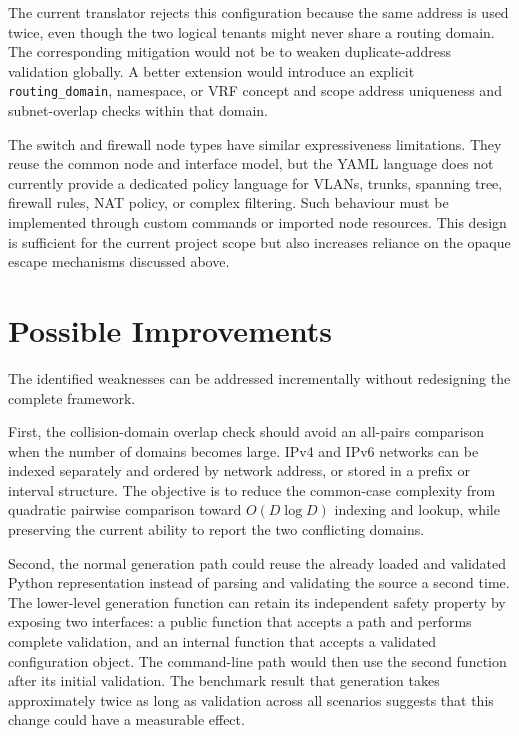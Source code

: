 The current translator rejects this configuration because the same address is
used twice, even though the two logical tenants might never share a routing
domain. The corresponding mitigation would not be to weaken duplicate-address
validation globally. A better extension would introduce an explicit
\texttt{routing\_domain}, namespace, or VRF concept and scope address
uniqueness and subnet-overlap checks within that domain.

The switch and firewall node types have similar expressiveness limitations.
They reuse the common node and interface model, but the YAML language does not
currently provide a dedicated policy language for VLANs, trunks, spanning
tree, firewall rules, NAT policy, or complex filtering. Such behaviour must be
implemented through custom commands or imported node resources. This design is
sufficient for the current project scope but also increases reliance on the
opaque escape mechanisms discussed above.

\section{Possible Improvements}
\label{sec:possible-security-scalability-improvements}

The identified weaknesses can be addressed incrementally without redesigning
the complete framework.

First, the collision-domain overlap check should avoid an all-pairs comparison
when the number of domains becomes large. IPv4 and IPv6 networks can be
indexed separately and ordered by network address, or stored in a prefix or
interval structure. The objective is to reduce the common-case complexity from
quadratic pairwise comparison toward \(O(D \log D)\) indexing and lookup,
while preserving the current ability to report the two conflicting domains.

Second, the normal generation path could reuse the already loaded and
validated Python representation instead of parsing and validating the source a
second time. The lower-level generation function can retain its independent
safety property by exposing two interfaces: a public function that accepts a
path and performs complete validation, and an internal function that accepts a
validated configuration object. The command-line path would then use the
second function after its initial validation. The benchmark result that
generation takes approximately twice as long as validation across all
scenarios suggests that this change could have a measurable effect.

